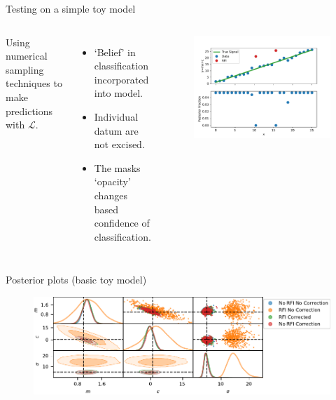 \documentclass{beamer}
\begin{document}
\begin{frame}{Testing on a simple toy model}
\begin{columns}
Using numerical sampling techniques to make predictions with $\mathcal{L}$.
\begin{itemize}
\item `Belief' in classification incorporated into model.
\item Individual datum are not excised.
\item The masks `opacity' changes based confidence of classification.
\end{itemize}
\begin{figure}
	\includegraphics[width=\textwidth]{test.pdf}
\end{figure}
\end{columns}
\end{frame}

\begin{frame}{Posterior plots (basic toy model)}
\begin{figure}
\includegraphics[width=1\textwidth]{toy9pane.pdf}
\end{figure}
\end{frame}
\end{document}
